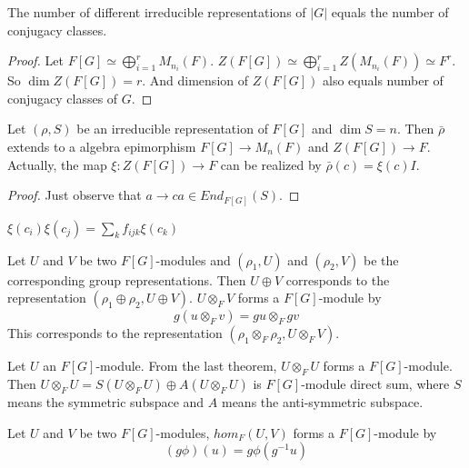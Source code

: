 \documentclass[12pt]{book}
\begin{document}
	\begin{theorem}
		The number of different irreducible representations of $|G|$ equals the number of conjugacy classes.
	\end{theorem}
	
	\begin{proof}
		Let $F[G]\simeq \bigoplus_{i=1}^r M_{n_i}(F)$. $Z(F[G])\simeq \bigoplus_{i=1}^r Z(M_{n_i}(F))\simeq F^r$. So $\dim Z(F[G])=r$. And dimension of $Z(F[G])$ also equals number of conjugacy classes of $G$.
	\end{proof}
	
	\begin{theorem}
		Let $(\rho,S)$ be an irreducible representation of $F[G]$ and $\dim S=n$. Then $\bar\rho$ extends to a algebra epimorphism $F[G]\rightarrow M_n(F)$ and $Z(F[G])\rightarrow F$. Actually, the map $\xi:Z(F[G])\rightarrow F$ can be realized by $\bar\rho(c)=\xi(c)I$. \label{thm:class_funcf}
	\end{theorem}
	\begin{proof}
		Just observe that $a\rightarrow ca\in End_{F[G]}(S)$. 
	\end{proof}
	\begin{corollary}
		$\xi(c_i)\xi(c_j)=\sum_k f_{ijk}\xi(c_k)$
	\end{corollary}
	
	\begin{theorem}
		Let $U$ and $V$ be two $F[G]$-modules and $(\rho_1,U)$ and $(\rho_2,V)$ be the corresponding group representations. Then $U\oplus V$ corresponds to the representation $(\rho_1\oplus \rho_2,U\oplus V)$. $U\otimes_F V$ forms a $F[G]$-module by
		\begin{equation}
			g(u\otimes_F v)=gu\otimes_F gv
		\end{equation}
		This corresponds to the representation $(\rho_1\otimes_F \rho_2,U\otimes_F V)$.
	\end{theorem}
	\begin{theorem}
		Let $U$ an $F[G]$-module. From the last theorem, $U\otimes_F U$ forms a $F[G]$-module. Then $U\otimes_F U=S(U\otimes_F U)\oplus A(U\otimes_F U)$ is $F[G]$-module direct sum, where $S$ means the symmetric subspace and $A$ means the anti-symmetric subspace. 
	\end{theorem}
	
	\begin{theorem}
		Let $U$ and $V$ be two $F[G]$-modules, $hom_F(U,V)$ forms a $F[G]$-module by
		\begin{equation}
			(g\phi)(u)=g \phi(g^{-1}u)
		\end{equation}
	\end{theorem}
\end{document}
